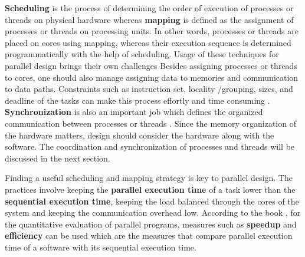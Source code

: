 \textbf{Scheduling} is the process of determining the order of execution of processes or threads on physical hardware whereas \textbf{mapping} is defined as the assignment of processes or threads on processing units. In other words, processes or threads are placed on cores using mapping, whereas their execution sequence is determined programmatically with the help of scheduling. Usage of these techniques for parallel design brings their own challenges Besides assigning processes or threads to cores, one should also manage assigning data to memories and communication to data paths. Constraints such as instruction set, locality /grouping,  sizes, and deadline of the tasks can make this process effortly and time consuming \cite{lukas1}. \textbf{Synchronization} is also an important job which defines the organized communication between processes or threads \cite{springerparallel}. Since the memory organization of the hardware matters, design should consider the hardware along with the software. The coordination and synchronization of processes and threads will be discussed in the next section.

Finding a useful scheduling and mapping strategy is key to parallel design. The practices involve keeping the \textbf{parallel execution time} of a task lower than the \textbf{sequential execution time}, keeping the load balanced through the cores of the system and keeping the communication overhead low. According to the book \cite{springerparallel}, for the quantitative evaluation of parallel programs, measures such as \textbf{speedup} and \textbf{efficiency} can be used which are the measures that compare parallel execution time of a software with its sequential execution time.

